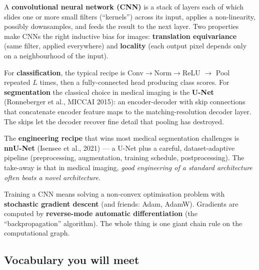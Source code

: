 \documentclass[11pt,a4paper]{article}
\begin{document}
A \textbf{convolutional neural network (CNN)} is a stack of layers
each of which slides one or more small filters (``kernels'') across
its input, applies a non-linearity, possibly downsamples, and feeds
the result to the next layer. Two properties make CNNs the right
inductive bias for images:
\textbf{translation equivariance} (same filter, applied
everywhere) and \textbf{locality} (each output pixel depends only
on a neighbourhood of the input).

For \textbf{classification}, the typical recipe is
Conv$\to$Norm$\to$ReLU $\to$ Pool repeated $L$ times, then a
fully-connected head producing class scores. For
\textbf{segmentation} the classical choice in medical imaging is
the \textbf{U-Net} (Ronneberger et al., MICCAI 2015): an
encoder-decoder with skip connections that concatenate
encoder feature maps to the matching-resolution decoder layer. The
skips let the decoder recover fine detail that pooling has
destroyed.

The \textbf{engineering recipe} that wins most medical segmentation
challenges is \textbf{nnU-Net} (Isensee et al., 2021) --- a U-Net
plus a careful, dataset-adaptive pipeline (preprocessing,
augmentation, training schedule, postprocessing). The take-away is
that in medical imaging, \emph{good engineering of a standard
architecture often beats a novel architecture}.

Training a CNN means solving a non-convex optimisation problem with
\textbf{stochastic gradient descent} (and friends: Adam, AdamW).
Gradients are computed by \textbf{reverse-mode automatic
differentiation} (the ``backpropagation'' algorithm). The whole
thing is one giant chain rule on the computational graph.

\subsection{Vocabulary you will meet}
\end{document}

